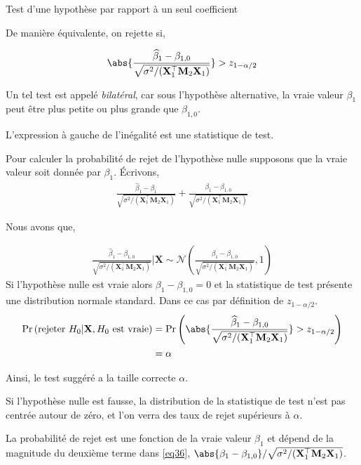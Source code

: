 \begin{frame}[allowframebreaks]{Test d'une hypothèse par rapport à un seul coefficient}
\medskip

De manière équivalente, on rejette si,

\begin{align}
\abs{\frac{\widehat{\beta}_1 - \beta_{1,0}}{ \sqrt{\sigma^2/(\mathbf{X}_1^\top\mathbf{M}_2\mathbf{X}_1)}}} > z_{1-\alpha/2}
\label{eq35}
\end{align}

Un tel test est appelé \emph{bilatéral}, car sous l'hypothèse alternative, la vraie valeur $\beta_1$ peut être plus petite ou plus grande que $\beta_{1,0}$.

\medskip

L'expression à gauche de l'inégalité est une statistique de test. 

\medskip
Pour calculer la probabilité de rejet de l'hypothèse nulle supposons que la vraie valeur soit donnée par $\beta_1$. \'Ecrivons, 
\begin{align}
\frac{\widehat{\beta}_1 - \beta_1}{ \sqrt{\sigma^2/(\mathbf{X}_1^\top\mathbf{M}_2\mathbf{X}_1)}} + 
\frac{\beta_1 - \beta_{1,0}}{ \sqrt{\sigma^2/(\mathbf{X}_1^\top\mathbf{M}_2\mathbf{X}_1)}} 
\label{eq36}
\end{align}

Nous avons que,

\begin{align*}
\frac{\widehat{\beta}_1 - \beta_{1,0}}{ \sqrt{\sigma^2/(\mathbf{X}_1^\top\mathbf{M}_2\mathbf{X}_1)}} | \mathbf{X}
 \sim
 \mathcal{N}\left( \frac{\beta_1 - \beta_{1,0}}{ \sqrt{\sigma^2/(\mathbf{X}_1^\top\mathbf{M}_2\mathbf{X}_1)}}, 1 \right) 
\end{align*}
Si l'hypothèse nulle est vraie alors $\beta_1-\beta_{1,0} = 0$ et la statistique de test présente une distribution normale standard. Dans ce cas par définition de $z_{1-\alpha/2}$.
\begin{align*}
\Pr\left(\textrm{rejeter} \ H_0 | \mathbf{X}, H_0 \ \textrm{est vraie}\right) &= 
\Pr\left(\abs{\frac{\widehat{\beta}_1 - \beta_{1,0}}{ \sqrt{\sigma^2/(\mathbf{X}_1^\top\mathbf{M}_2\mathbf{X}_1)}}} > z_{1-\alpha/2}\right)\\
&= \alpha
\end{align*}

Ainsi, le test suggéré a la taille correcte $\alpha$.

\medskip
 Si l'hypothèse nulle est fausse, la distribution de la statistique de test n'est pas centrée autour de zéro, et l'on verra des taux de rejet supérieurs à $\alpha$.
 
 \medskip
La probabilité de rejet est une fonction de la vraie valeur $\beta_1$ et dépend de la magnitude du deuxième terme dans \eqref{eq36}, $\abs{\beta_1 - \beta_{1,0}}/ \sqrt{\sigma^2/(\mathbf{X}_1^\top\mathbf{M}_2\mathbf{X}_1)}$. 


\end{frame}
